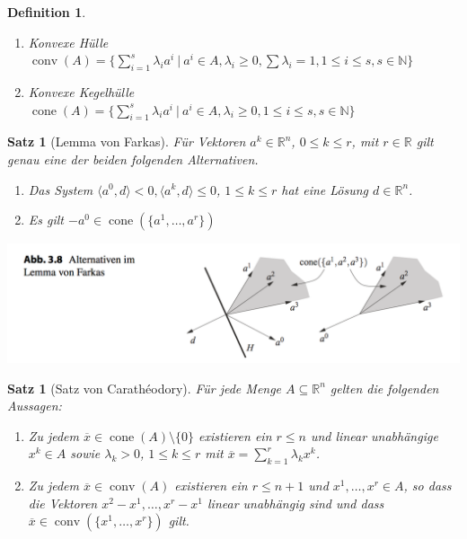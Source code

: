 \documentclass[11pt]{scrreprt}
\newcounter{thm}
\theoremstyle{thmstyle}
\numberwithin{thm}{section}
\newtheorem{satz}[thm]{Satz}
\newtheorem*{definition*}{Definition}
\begin{document}
\begin{definition*}
	\begin{enumerate}[label=\alph*\upshape)]
		\item Konvexe Hülle $\operatorname{conv}(A) = \big\{ \sum_{i=1}^s \lambda_i a^i ~|~ a^i \in A, \lambda_i \geq 0, \sum \lambda_i = 1, 1 \leq i \leq s, s \in \mathbb{N} \big\}$
		\item Konvexe Kegelhülle $\operatorname{cone}(A) = \big\{ \sum_{i=1}^s \lambda_i a^i ~|~ a^i \in A, \lambda_i \geq 0, 1 \leq i \leq s, s \in \mathbb{N} \big\}$
	\end{enumerate}	
\end{definition*}
 
\begin{satz}[Lemma von Farkas] 
	Für Vektoren $a^k \in \mathbb{R}^n$, $0 \leq k \leq r$, mit $r \in \mathbb{R}$ gilt genau eine der beiden folgenden Alternativen.
	\begin{enumerate}[label=\alph*\upshape)]
		\item Das System $\langle a^0, d \rangle < 0, \langle a^k, d \rangle \leq 0$, $1 \leq k \leq r$ hat eine Lösung $d \in \mathbb{R}^n$.
		\item Es gilt $-a^0 \in \operatorname{cone}(\{a^1, \dotsc, a^r \})$
	\end{enumerate}
\end{satz}

\begin{center}
	\includegraphics[scale=0.5]{ab38}
\end{center}
 
\begin{satz}[Satz von Carathéodory]
	Für jede Menge $A \subseteq \mathbb{R}^n$ gelten die folgenden Aussagen:
	\begin{enumerate}[label=\alph*\upshape)]
		\item Zu jedem $\overline{x} \in \operatorname{cone}(A) \setminus \{ 0 \}$ existieren ein $r \leq n$ und linear unabhängige $x^k \in A$ sowie $\lambda_k > 0$, $1 \leq k \leq r$ mit $\overline{x} = \sum_{k=1}^r \lambda_k x^k$.
		\item Zu jedem $\overline{x} \in \operatorname{conv}(A)$ existieren ein $r \leq n + 1$ und $x^1, \dotsc, x^r \in A$, so dass die Vektoren $x^2 - x^1, \dotsc, x^r - x^1$ linear unabhängig sind und dass $\overline{x} \in \operatorname{conv}(\{ x^1, \dotsc, x^r \})$ gilt.
	\end{enumerate}
\end{satz} 
 
\end{document}
